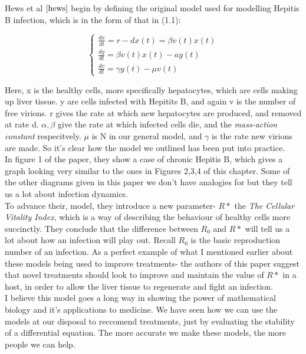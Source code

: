 Hews et al $\cite{hews}$ begin by defining the original model used for modelling Hepitis B infection, which is in the form of that in (1.1):

\begin{equation}
    \begin{cases}
        \frac{dx}{dt} = r - dx(t) = \beta v(t)x(t) \\
        \frac{dy}{dt} = \beta v(t)x(t) - ay(t) \\
        \frac{dv}{dt} = \gamma y(t) - \mu v(t)
    \end{cases}
\end{equation}

Here, x is the healthy cells, more specifically hepatocytes, which are cells making up liver tissue. y are cells infected with Hepitits B, and again v is the number of free virions. r gives the rate at which new hepatocytes are produced, and removed at rate d. $\alpha, \beta$ give the rate at which infected cells die, and the  \textit{mass-action constant} respecitvely. $\mu$ is N in our general model, and  $\gamma$ is the rate new virions are made. So it's clear how the model we outlined has been put into practice. \\

In figure 1 of the paper, they show a case of chronic Hepitis B, which gives a graph looking very similar to the ones in Figures 2,3,4 of this chapter. Some of the other diagrams given in this paper we don't have analogies for but they tell us a lot about infection dynamics. \\

To advance their, model, they introduce a new parameter- $R*$ the  \textit{The Cellular Vitality Index}, which is a way of describing the behaviour of healthy cells more succinctly. They conclude that the difference between $R_0$ and  $R*$ will tell us a lot about how an infection will play out. Recall  $R_0$ is the basic reproduction number of an infection. As a perfect example of what I mentioned earlier about these models being used to improve treatments- the authors of this paper suggest that novel treatments should look to improve and maintain the value of  $R*$ in a host, in order to allow the liver tissue to regenerate and fight an infection. \\

I believe this model goes a long way in showing the power of mathematical biology and it's applications to medicine. We have seen how we can use the models at our disposal to reccomend treatments, just by evaluating the stability of a differential equation. The more accurate we make these models, the more people we can help.


{}

